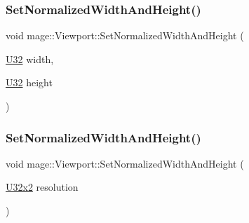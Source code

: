 \subsubsection{\texorpdfstring{Set\+Normalized\+Width\+And\+Height()}{SetNormalizedWidthAndHeight()}\hspace{0.1cm}{\footnotesize\ttfamily [1/4]}}
{\footnotesize\ttfamily void mage\+::\+Viewport\+::\+Set\+Normalized\+Width\+And\+Height (\begin{DoxyParamCaption}\item[{\hyperlink{namespacemage_a41c104c036fba3756a74e19f793eeaa1}{U32}}]{width,  }\item[{\hyperlink{namespacemage_a41c104c036fba3756a74e19f793eeaa1}{U32}}]{height }\end{DoxyParamCaption})\hspace{0.3cm}{\ttfamily [noexcept]}}

\hypertarget{classmage_1_1_viewport_a1fff49679e896410eb3007cb6775de67}{}\label{classmage_1_1_viewport_a1fff49679e896410eb3007cb6775de67} 
\subsubsection{\texorpdfstring{Set\+Normalized\+Width\+And\+Height()}{SetNormalizedWidthAndHeight()}\hspace{0.1cm}{\footnotesize\ttfamily [2/4]}}
{\footnotesize\ttfamily void mage\+::\+Viewport\+::\+Set\+Normalized\+Width\+And\+Height (\begin{DoxyParamCaption}\item[{\hyperlink{namespacemage_a88e05bff0300120c013285d3dcad95c5}{U32x2}}]{resolution }\end{DoxyParamCaption})\hspace{0.3cm}{\ttfamily [noexcept]}}

\hypertarget{classmage_1_1_viewport_ae456cd1a570d41bff6939d29722fa8ca}{}\label{classmage_1_1_viewport_ae456cd1a570d41bff6939d29722fa8ca} 
